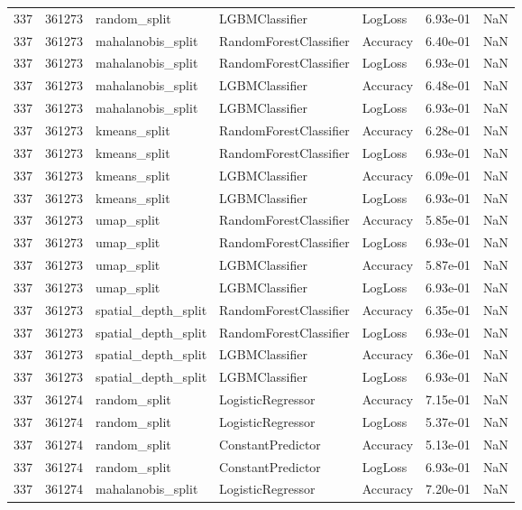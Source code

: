 \begin{tabular}{rrlllrr}
337 & 361273 & random\_split & LGBMClassifier & LogLoss & 6.93e-01 & NaN \\
337 & 361273 & mahalanobis\_split & RandomForestClassifier & Accuracy & 6.40e-01 & NaN \\
337 & 361273 & mahalanobis\_split & RandomForestClassifier & LogLoss & 6.93e-01 & NaN \\
337 & 361273 & mahalanobis\_split & LGBMClassifier & Accuracy & 6.48e-01 & NaN \\
337 & 361273 & mahalanobis\_split & LGBMClassifier & LogLoss & 6.93e-01 & NaN \\
337 & 361273 & kmeans\_split & RandomForestClassifier & Accuracy & 6.28e-01 & NaN \\
337 & 361273 & kmeans\_split & RandomForestClassifier & LogLoss & 6.93e-01 & NaN \\
337 & 361273 & kmeans\_split & LGBMClassifier & Accuracy & 6.09e-01 & NaN \\
337 & 361273 & kmeans\_split & LGBMClassifier & LogLoss & 6.93e-01 & NaN \\
337 & 361273 & umap\_split & RandomForestClassifier & Accuracy & 5.85e-01 & NaN \\
337 & 361273 & umap\_split & RandomForestClassifier & LogLoss & 6.93e-01 & NaN \\
337 & 361273 & umap\_split & LGBMClassifier & Accuracy & 5.87e-01 & NaN \\
337 & 361273 & umap\_split & LGBMClassifier & LogLoss & 6.93e-01 & NaN \\
337 & 361273 & spatial\_depth\_split & RandomForestClassifier & Accuracy & 6.35e-01 & NaN \\
337 & 361273 & spatial\_depth\_split & RandomForestClassifier & LogLoss & 6.93e-01 & NaN \\
337 & 361273 & spatial\_depth\_split & LGBMClassifier & Accuracy & 6.36e-01 & NaN \\
337 & 361273 & spatial\_depth\_split & LGBMClassifier & LogLoss & 6.93e-01 & NaN \\
337 & 361274 & random\_split & LogisticRegressor & Accuracy & 7.15e-01 & NaN \\
337 & 361274 & random\_split & LogisticRegressor & LogLoss & 5.37e-01 & NaN \\
337 & 361274 & random\_split & ConstantPredictor & Accuracy & 5.13e-01 & NaN \\
337 & 361274 & random\_split & ConstantPredictor & LogLoss & 6.93e-01 & NaN \\
337 & 361274 & mahalanobis\_split & LogisticRegressor & Accuracy & 7.20e-01 & NaN \\

\end{tabular}
